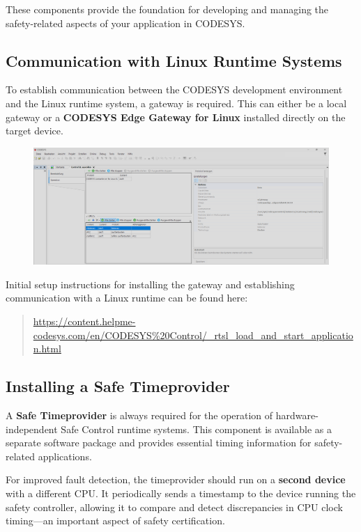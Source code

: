 \documentclass[a4paper,12pt]{article}
\begin{document}
These components provide the foundation for developing and managing the safety-related aspects of your application in CODESYS.

\subsection{Communication with Linux Runtime Systems}

To establish communication between the CODESYS development environment and the Linux runtime system, a gateway is required. This can either be a local gateway or a \textbf{CODESYS Edge Gateway for Linux} installed directly on the target device.

\begin{figure}[H]
	\centering
	\includegraphics[width=1\textwidth]{gateway.png}
\end{figure}

Initial setup instructions for installing the gateway and establishing communication with a Linux runtime can be found here:

\begin{quote}
	\url{https://content.helpme-codesys.com/en/CODESYS%20Control/_rtsl_load_and_start_application.html}
\end{quote}

\subsection{Installing a Safe Timeprovider}

A \textbf{Safe Timeprovider} is always required for the operation of hardware-independent Safe Control runtime systems. This component is available as a separate software package and provides essential timing information for safety-related applications.

For improved fault detection, the timeprovider should run on a \textbf{second device} with a different CPU. It periodically sends a timestamp to the device running the safety controller, allowing it to compare and detect discrepancies in CPU clock timing—an important aspect of safety certification.
\end{document}
